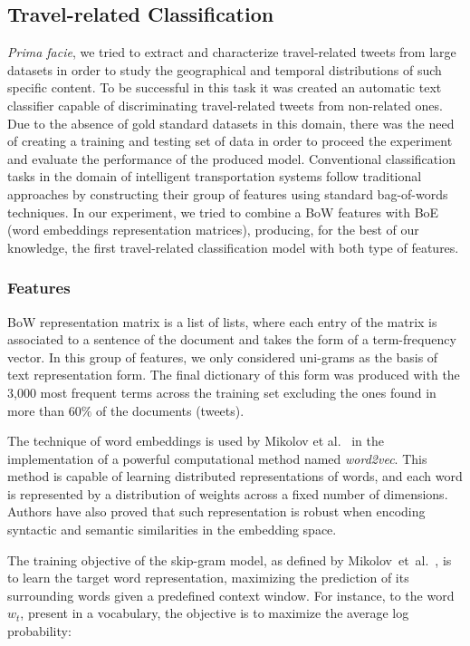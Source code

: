 \subsection{Travel-related Classification}
\label{sec:travel_classification}

\emph{Prima facie}, we tried to extract and characterize travel-related tweets from large datasets in order to study the geographical and temporal distributions of such specific content. To be successful in this task it was created an automatic text classifier capable of discriminating travel-related tweets from non-related ones. Due to the absence of gold standard datasets in this domain, there was the need of creating a training and testing set of data in order to proceed the experiment and evaluate the performance of the produced model. Conventional classification tasks in the domain of intelligent transportation systems follow traditional approaches by constructing their group of features using standard bag-of-words techniques. In our experiment, we tried to combine a \gls{BoW} features with \gls{BoE} (word embeddings representation matrices), producing, for the best of our knowledge, the first travel-related classification model with both type of features.

\subsubsection{Features}
\label{sec:travel_features}
\gls{BoW} representation matrix is a list of lists, where each entry of the matrix is associated to a sentence of the document and takes the form of a term-frequency vector. In this group of features, we only considered uni-grams as the basis of text representation form. The final dictionary of this form was produced with the 3,000 most frequent terms across the training set excluding the ones found in more than 60$\%$ of the documents (tweets).

The technique of word embeddings is used by Mikolov et al.~\cite{mikolov2013efficient} in the implementation of a powerful computational method named \emph{word2vec}. This method is capable of learning distributed representations of words, and each word is represented by a distribution of weights across a fixed number of dimensions. Authors have also proved that such representation is robust when encoding syntactic and semantic similarities in the embedding space.

The training objective of the skip-gram model, as defined by Mikolov~et~al.~\cite{mikolov2013linguistic}, is to learn the target word representation, maximizing the prediction of its surrounding words given a predefined context window. For instance, to the word $w_t$, present in a vocabulary, the objective is to maximize the average log probability:

